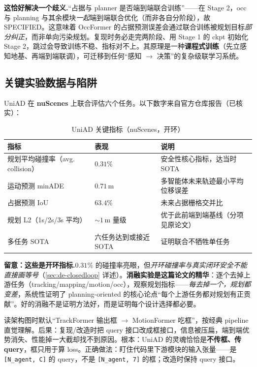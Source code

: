 \begin{note}
\textbf{这恰好解决一个歧义.}\;“占据与 planner 是否端到端联合训练”——在 Stage 2，occ 与 planning 与其余模块\emph{一起}端到端联合优化（而非各自分阶段），故 SPECIFIED。这意味着 OccFormer 的占据预测误差会通过联合训练被规划目标\emph{部分纠正}，而非单向污染规划。复现时务必走完两阶段、用 Stage 1 的 ckpt 初始化 Stage 2，跳过会导致训练不稳、指标对不上。其原理是一种\textbf{课程式训练}（先立感知地基、再端到端联调），可迁移到任何“感知 $\to$ 决策”的复杂级联学习系统。
\end{note}

\subsection{关键实验数据与陷阱}
\label{sec:de-uniad-exp}

UniAD 在 \textbf{nuScenes} 上联合评估六个任务。以下数字来自官方仓库报告（已核实）：

\begin{table}[H]\centering\small
\caption{UniAD 关键指标（nuScenes，开环）}
\label{tab:de-uniad-metrics}
\begin{tabular}{p{} p{} p{}}
\toprule
指标 & 表现 & 说明 \\
\midrule
规划平均碰撞率（avg. collision） & $\mathbf{0.31\%}$ & 安全性核心指标，达当时 SOTA \\
运动预测 minADE & $\mathbf{0.71}$\,m & 多智能体未来轨迹最小平均位移误差 \\
占据预测 IoU & $\mathbf{63.4\%}$ & 未来占据栅格交并比 \\
规划 L2（1s/2s/3s 平均） & $\sim 1$\,m 量级 & 优于此前端到端基线（分项见原论文） \\
多任务 SOTA & 六任务达到或接近 SOTA & 证明联合不牺牲单任务 \\
\bottomrule
\end{tabular}
\end{table}

\begin{note}
\textbf{留意：这些是开环指标.}\;$0.31\%$ 的碰撞率亮眼，但\emph{开环碰撞率与真实闭环安全不能直接画等号}（\cref{sec:de-closedloop} 详述）。\textbf{消融实验是这篇论文的精华}：逐个去掉上游任务（tracking/mapping/motion/occ），观察规划指标——\emph{每去掉一个，规划都变差}，系统性证明了 planning-oriented 的核心论点“每个上游任务都对规划有正贡献”。好的消融不是证明方法好，而是证明每个设计选择都必要。
\end{note}

\begin{pitfall}
读架构图时默认“TrackFormer 输出框 $\to$ MotionFormer 吃框”，按经典 pipeline 直觉理解。后果：复现/改造时把 query 接口改成框接口，信息被压扁，端到端优势消失、性能掉一大截却找不到原因。根本：UniAD 的灵魂恰恰是\textbf{不传框、传 query}，框只用于算 loss。正确做法：盯住代码里下游模块的输入张量——是 \texttt{[N\_agent, C]} 的 query，不是 \texttt{[N\_agent, 7]} 的框；改造时保持 query 接口。
\end{pitfall}

